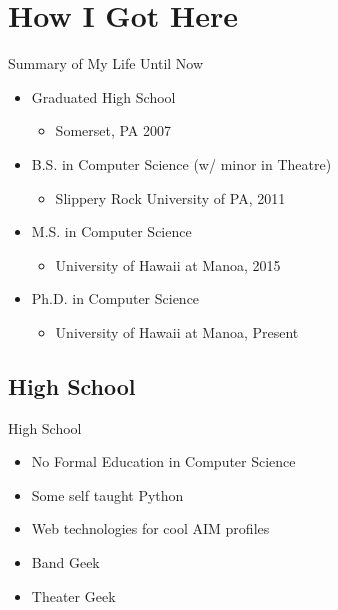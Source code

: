 \documentclass{beamer}
\begin{document}
\section{How I Got Here}
\begin{frame}{Summary of My Life Until Now}
\begin{itemize}
	\item Graduated High School
	\begin{itemize}
		\item Somerset, PA 2007
	\end{itemize}
	\item B.S. in Computer Science (w/ minor in Theatre)
	\begin{itemize}
		\item Slippery Rock University of PA, 2011
	\end{itemize}
	\item M.S. in Computer Science
	\begin{itemize}
		\item University of Hawaii at Manoa, 2015
	\end{itemize}
	\item Ph.D. in Computer Science
	\begin{itemize}
		\item University of Hawaii at Manoa, Present
	\end{itemize}
\end{itemize}
\end{frame}

\subsection{High School}
\begin{frame}{High School}
\begin{itemize}
	\item No Formal Education in Computer Science
	\item Some self taught Python
	\item Web technologies for cool AIM profiles
	\item Band Geek
	\item Theater Geek
\end{itemize}
\end{frame}
\end{document}
